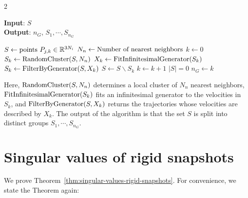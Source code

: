 \documentclass{article}
\newcommand{\R}{\mathbb{R}}                                 %
\begin{document}
\begin{multicols}{2}
\begin{algorithm}[H]
    \caption{Clustering}\label{app:cluster_search}
    \hspace*{\algorithmicindent} \textbf{Input}: $S$ \\
    \hspace*{\algorithmicindent} \textbf{Output}: $n_G$, $S_1,\cdots, S_{n_G}$ 
    \begin{algorithmic}[1]
        \State $S \gets \textnormal{points } P_{j,k}\in \R^{3 N_i}$
        \State $N_n \gets \textnormal{Number of nearest neighbors}$
        \State $k \gets 0$
        \Repeat
            \State $S_k \gets \textnormal{RandomCluster}(S,N_n)$
            \State $X_k \gets \textnormal{FitInfinitesimalGenerator}(S_k)$
            \State $S_k \gets \textnormal{FilterByGenerator}(S,X_k)$
            \State $S \gets S\backslash S_k$
            \State $k \gets k + 1$
        \Until $|S| = 0$
        \State $n_G \gets k$
    \end{algorithmic}
\end{algorithm}
Here, $\textnormal{RandomCluster}(S,N_n)$ determines a local cluster of $N_n$ nearest neighbors, $\textnormal{FitInfinitesimalGenerator}(S_k)$ fits an infinitesimal generator to the velocities in $S_k$, and $\textnormal{FilterByGenerator}(S,X_k)$ returns the trajectories whose velocities are described by $X_k$. The output of the algorithm is that the set $S$ is split into distinct groups $S_1,\cdots, S_{n_G}$. %


\section{Singular values of rigid snapshots}\label{ssec:appendix-rigid-svd}

We prove Theorem~\ref{thm:singular-values-rigid-snapshots}. For convenience, we state the Theorem again:


\end{multicols}
\end{document}
